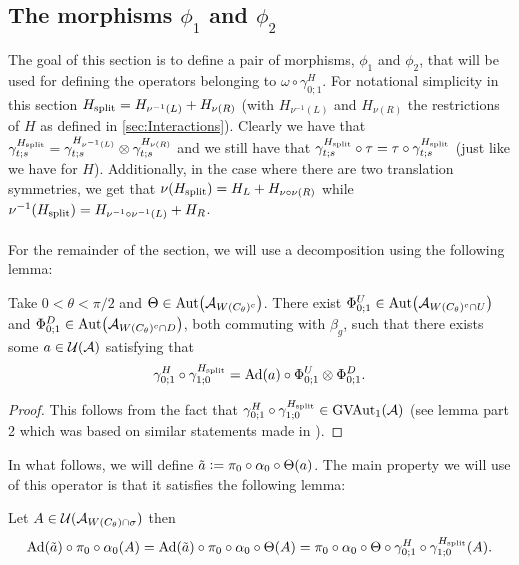 \documentclass[11pt,a4paper,twoside]{article}
\def\version{1}
\newcommand{\versionDifference}[2]{\ifthenelse{\version=0}{#1}{#2}}
\numberwithin{equation}{section}
\begin{document}
	\subsection{The morphisms \texorpdfstring{$\phi_1$}{} and \texorpdfstring{$\phi_2$}{}}
	The goal of this section is to define a pair of morphisms, $\phi_1$ and $\phi_2$, that will be used for defining the operators belonging to $\omega\circ\gamma^H_{0;1}$. For notational simplicity in this section ${H_{\text{split}}}=H_{\nu^{-1}(L)}+H_{\nu(R)}$ (with $H_{\nu^{-1}(L)}$ and $H_{\nu(R)}$ the restrictions of $H$ as defined in \ref{sec:Interactions}). Clearly we have that $\gamma^{{H_{\text{split}}}}_{t;s}=\gamma^{H_{\nu^{-1}(L)}}_{t;s}\otimes\gamma^{H_{\nu(R)}}_{t;s}$ and we still have that $\gamma^{{H_{\text{split}}}}_{t;s}\circ\tau=\tau\circ\gamma^{{H_{\text{split}}}}_{t;s}$ (just like we have for $H$). Additionally, in the case where there are two translation symmetries, we get that $\nu({H_{\text{split}}})=H_L+H_{\nu\circ\nu(R)}$ while $\nu^{-1}({H_{\text{split}}})=H_{\nu^{-1}\circ\nu^{-1}(L)}+H_{R}$.\\\\
	For the remainder of the section, we will use a decomposition using the following lemma:
	\begin{lemma}\label{lem:DefinitionOfGroupMorphismVAutEquation}
		Take $0<\theta<\pi/2$ and $\Theta\in \Aut{\AA_{W(C_\theta)^c}}$. There exist $\Phi^U_{0;1}\in\Aut{\AA_{W(C_\theta)^c\cap U}}$ and $\Phi^D_{0;1}\in\Aut{\AA_{W(C_\theta)^c\cap D}}$, both commuting with $\beta_g$, such that there exists some $a\in\mathcal U(\mathcal A)$ satisfying that
		\begin{equation}\label{eq:DefinitionOfGroupMorphismVAutEquation}
			\gamma^H_{0;1}\circ\gamma^{\Hsplit}_{1;0}=\Ad{a}\circ \Phi^U_{0;1}\otimes\Phi^D_{0;1}.
		\end{equation}
	\end{lemma}
	\begin{proof}
		This follows from the fact that $\gamma^H_{0;1}\circ\gamma^{{H_{\text{split}}}}_{1;0}\in \textrm{GVAut}_1(\mathcal A)$ (see lemma \versionDifference{\ref{lem:PropertiesLocallyGeneratedAutomorphisms}}{C.4. of \cite{jappens2023spt}} part 2 which was based on similar statements made in \cite{ogata2021h3gmathbb}).
	\end{proof}
	In what follows, we will define $\tilde{a}\vcentcolon= \pi_0\circ\alpha_0\circ\Theta(a)$. The main property we will use of this operator is that it satisfies the following lemma:
	\begin{lemma}\label{lem:PropertyTilde_a}
		Let $A\in\mathcal U(\mathcal A_{W(C_\theta)\cap\sigma})$ then
		\begin{equation}
			\Ad{\tilde{a}}\circ\pi_0\circ\alpha_0(A)=\Ad{\tilde{a}}\circ\pi_0\circ\alpha_0\circ\Theta(A)=\pi_0\circ\alpha_0\circ\Theta\circ\gamma^H_{0;1}\circ\gamma^{\Hsplit}_{1;0}(A).
		\end{equation}
	\end{lemma}
\end{document}
